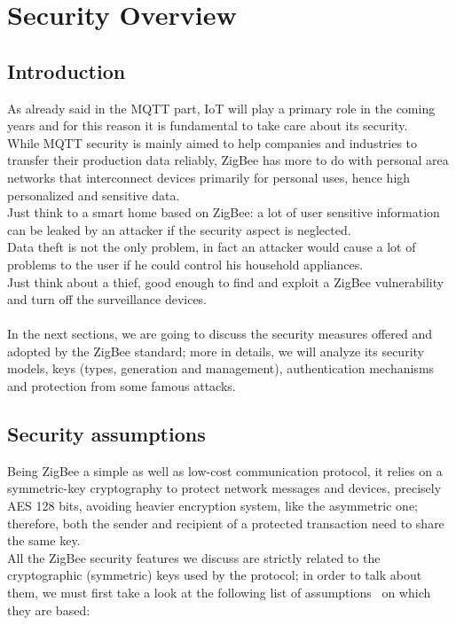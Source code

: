\documentclass[12pt]{report}
\begin{document}
{\chapter{Security Overview}
\label{chap:zigbeesecchap}

\section{Introduction}
\bigskip
As already said in the MQTT part, IoT will play a primary role in the coming years and for this reason it is fundamental to take care about its security.\\
While MQTT security is mainly aimed to help companies and industries to transfer their production data reliably, ZigBee has more to do with personal area networks that interconnect devices primarily for personal uses, hence high personalized and sensitive data.\\
Just think to a smart home based on ZigBee: a lot of user sensitive information can be leaked by an attacker if the security aspect is neglected.\\
Data theft is not the only problem, in fact an attacker would cause a lot of problems to the user if he could control his household appliances.\\
Just think about a thief, good enough to find and exploit a ZigBee vulnerability and turn off the surveillance devices.\\\\

In the next sections, we are going to discuss the security measures offered and adopted by the ZigBee standard; more in details, we will analyze its security models, keys (types, generation and management), authentication mechanisms and protection from some famous attacks.\\


\clearpage
\section{Security assumptions}
\label{sec:zigbeesecassumptions}
\bigskip
Being ZigBee a simple as well as low-cost communication protocol, it relies on a symmetric-key cryptography to protect network messages and devices, precisely AES 128 bits, avoiding heavier encryption system, like the asymmetric one; therefore, both the sender and recipient of a protected transaction need to share the same key.\\

All the ZigBee security features we discuss are strictly related to the cryptographic (symmetric) keys used by the protocol; in order to talk about them, we must first take a look at the following list of assumptions~\cite{secanalysisofzigbee} on which they are based:

}
\end{document}
